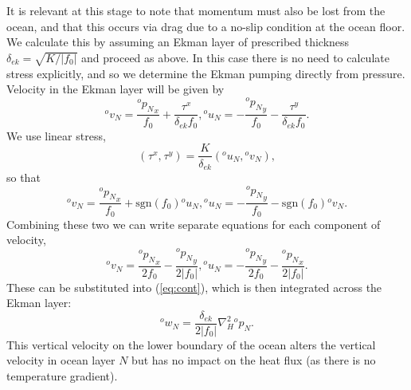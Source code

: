 \documentclass[11pt, a4paper,twoside]{article}
\newcommand{\p}[2]{{{}^{#1}p_{#2}}}
\newcommand{\uu}[2]{{{}^{#1}u_{#2}}}
\newcommand{\vv}[2]{{{}^{#1}v_{#2}}}
\newcommand{\ww}[2]{{{}^{#1}w_{#2}}}
\newcommand{\tx}[2]{{}^{#1}\tau^{#2}}
\newcommand{\delek}[0]{\delta_{ek}}
\numberwithin{equation}{section}
\begin{document}
It is relevant at this stage to note that momentum must also be lost from the ocean, and that this occurs via drag due to a no-slip condition at the ocean floor.
We calculate this by assuming an Ekman layer of prescribed thickness  $\delek= \sqrt{K/\lvert f_0\rvert}$ and proceed as above.
In this case there is no need to calculate stress explicitly, and so we determine the Ekman pumping directly from pressure.
Velocity in the Ekman layer will be given by
\begin{subequations}
\begin{equation}
\vv{o}{N} = \frac{\p{o}{N}_x}{f_0} + \frac{\tx{}{x}}{\delek f_0},
\end{equation}
\begin{equation}
\uu{o}{N} = -\frac{\p{o}{N}_y}{f_0} - \frac{\tx{}{y}}{\delek f_0}.
\end{equation}
\end{subequations}
We use linear  stress,
\begin{equation}
(\tx{}{x},\tx{}{y}) = \frac{K}{\delek}(\uu{o}{N},\vv{o}{N}),
\end{equation}
so that
\begin{subequations}
\begin{equation}
\vv{o}{N} = \frac{\p{o}{N}_x}{f_0} + \textrm{sgn}(f_0) \uu{o}{N},
\end{equation}
\begin{equation}
\uu{o}{N} = -\frac{\p{o}{N}_y}{f_0} -  \textrm{sgn}(f_0) \vv{o}{N}.
\end{equation}
\end{subequations}
Combining these two we can write separate equations for each component of velocity,
\begin{subequations}
\begin{equation}
\vv{o}{N} = \frac{\p{o}{N}_x}{2f_0} -\frac{\p{o}{N}_y}{2 \lvert f_0 \rvert},
\end{equation}
\begin{equation}
\uu{o}{N} = -\frac{\p{o}{N}_y}{2f_0} - \frac{\p{o}{N}_x}{2 \lvert f_0 \rvert }.
\end{equation}
\end{subequations}
These can be substituted into (\ref{eq:cont}), which is then integrated across the Ekman layer:
\begin{equation}\label{eq:contz}
\ww{o}{N} = \frac{\delek}{2 \lvert f_0 \rvert } \nabla_H^2\p{o}{N}.
\end{equation}
This vertical velocity on the lower  boundary of the ocean alters the vertical velocity in ocean layer $N$ but has no impact on the heat flux (as there is no temperature gradient).
\end{document}
